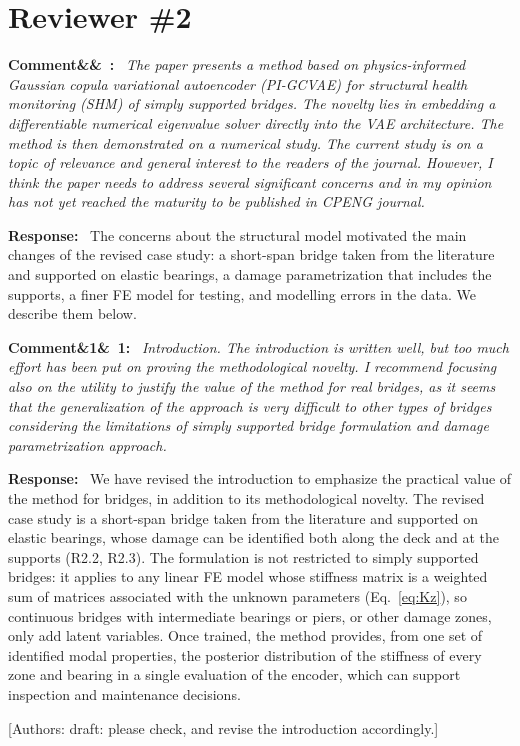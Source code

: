 \documentclass[11pt]{article}
\newenvironment{rcomment}[1]{\par\bigskip\noindent\textbf{Comment\ifx&#1&\else\ #1\fi:}\ \itshape}{\par}
\newenvironment{response}{\par\smallskip\noindent\color{resp}\textbf{Response:}\ }{\par}
\newcommand{\authornote}[1]{\textcolor{note}{\textsf{[Authors: #1]}}}
\begin{document}
\section{Reviewer \#2}

\begin{rcomment}{}
The paper presents a method based on physics-informed Gaussian copula variational autoencoder (PI-GCVAE) for
structural health monitoring (SHM) of simply supported bridges. The novelty lies in embedding a differentiable numerical
eigenvalue solver directly into the VAE architecture. The method is then demonstrated on a numerical study. The current
study is on a topic of relevance and general interest to the readers of the journal. However, I think the paper needs to
address several significant concerns and in my opinion has not yet reached the maturity to be published in CPENG
journal.
\end{rcomment}

\begin{response}
The concerns about the structural model motivated the main changes of the revised case study: a short-span bridge taken
from the literature and supported on elastic bearings, a damage parametrization that includes the supports, a finer FE
model for testing, and modelling errors in the data. We describe them below.
\end{response}

\begin{rcomment}{1}
Introduction. The introduction is written well, but too much effort has been put on proving the methodological novelty. I recommend focusing also on the utility to justify the value of the method for real bridges, as it seems that the generalization of the approach is very difficult to other types of bridges considering the limitations of simply
supported bridge formulation and damage parametrization approach.
\end{rcomment}

\begin{response}
We have revised the introduction to emphasize the practical value of the method for bridges, in addition to its
methodological novelty. The revised case study is a short-span bridge taken from the literature and supported on elastic
bearings, whose damage can be identified both along the deck and at the supports (R2.2, R2.3). The formulation is not
restricted to simply supported bridges: it applies to any linear FE model whose stiffness matrix is a weighted sum of
matrices associated with the unknown parameters (Eq.~\eqref{eq:Kz}), so continuous bridges with intermediate bearings or
piers, or other damage zones, only add latent variables. Once trained, the method provides, from one set of identified
modal properties, the posterior distribution of the stiffness of every zone and bearing in a single evaluation of the
encoder, which can support inspection and maintenance decisions.
\end{response}
\authornote{draft: please check, and revise the introduction accordingly.}
\end{document}
